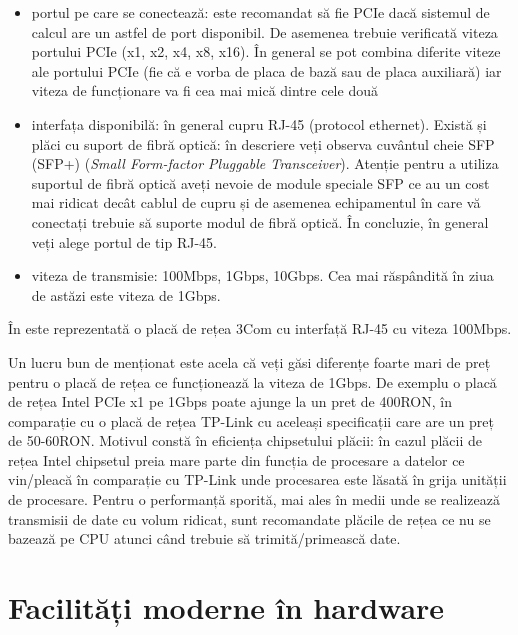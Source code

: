 \begin{itemize}
  \item portul pe care se conectează: este recomandat să fie PCIe dacă
          sistemul de calcul are un astfel de port disponibil. De asemenea
          trebuie verificată viteza portului PCIe (x1, x2, x4, x8, x16).
          În general se pot combina diferite viteze ale portului PCIe (fie
          că e vorba de placa de bază sau de placa auxiliară) iar viteza
          de funcționare va fi cea mai mică dintre cele două
  \item interfața disponibilă: în general cupru RJ-45 (protocol ethernet).
          Există și plăci cu suport de fibră optică: în descriere veți
          observa cuvântul cheie SFP  (SFP+) (\textit{Small Form-factor Pluggable Transceiver}). Atenție pentru a utiliza suportul
          de fibră optică aveți nevoie de module speciale SFP ce au un
          cost mai ridicat decât cablul de cupru și de asemenea
          echipamentul în care vă conectați trebuie să suporte modul de
          fibră optică. În concluzie, în general veți alege portul de tip
          RJ-45.
  \item viteza de transmisie: 100Mbps, 1Gbps, 10Gbps. Cea mai răspândită
          în ziua de astăzi este viteza de 1Gbps.
\end{itemize}

În  este reprezentată o placă de rețea 3Com cu interfață RJ-45 cu viteza 100Mbps.

Un lucru bun de menționat este acela că veți găsi diferențe foarte mari de preț
pentru o placă de rețea ce funcționează la viteza de 1Gbps. De exemplu o placă
de rețea Intel PCIe x1 pe 1Gbps poate ajunge la un pret de 400RON, în comparație
cu o placă de rețea TP-Link cu aceleași specificații care are un preț de
50-60RON. Motivul constă în eficiența chipsetului plăcii: în cazul plăcii de
rețea Intel chipsetul preia mare parte din funcția de procesare a datelor ce
vin/pleacă în comparație cu TP-Link unde procesarea este lăsată în grija
unității de procesare. Pentru o performanță sporită, mai ales în medii unde se
realizează transmisii de date cu volum ridicat, sunt recomandate plăcile de
rețea ce nu se bazează pe CPU atunci când trebuie să trimită/primească date.

\section{Facilități moderne în hardware}
\label{sec:hw:features}

